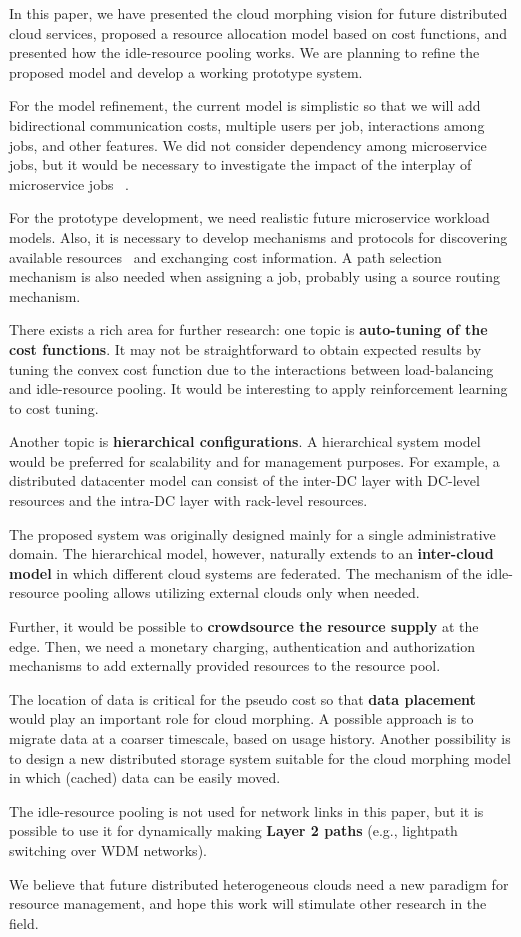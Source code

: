 
In this paper, we have presented the cloud morphing vision for
future distributed cloud services,
proposed a resource allocation model based on cost functions,
and presented how the idle-resource pooling works.
We are planning to refine the proposed model and develop a working
prototype system.

For the model refinement,
the current model is simplistic so that we will add bidirectional
communication costs,
multiple users per job, interactions among jobs, and other features.
We did not consider dependency among microservice jobs, but it would be
necessary to investigate the impact of the interplay of microservice
jobs ~\cite{Suresh-SOA-SOCC2017}.

For the prototype development,
we need realistic future microservice workload models.
Also, it is necessary to develop mechanisms and protocols for
discovering available resources~\cite{Albrecht2008} and exchanging
cost information.
A path selection mechanism is also needed when assigning a job,
probably using a source routing mechanism.

There exists a rich area for further research:
one topic is {\bf auto-tuning of the cost functions}.
It may not be straightforward to obtain expected results by tuning the
convex cost function due to the interactions between load-balancing
and idle-resource pooling.
It would be interesting to apply reinforcement learning to cost
tuning.

Another topic is {\bf hierarchical configurations}.
A hierarchical system model would be preferred for scalability
and for management purposes.
For example, a distributed datacenter model can consist of
the inter-DC layer with DC-level resources and the intra-DC layer
with rack-level resources.

The proposed system was originally designed mainly for a single
administrative domain.
The hierarchical model, however, naturally extends to
an {\bf inter-cloud model} in which different cloud systems are
federated.
The mechanism of the idle-resource pooling allows utilizing external
clouds only when needed.

Further, it would be possible to {\bf crowdsource the resource supply}
at the edge. 
Then, we need a monetary charging, authentication and authorization
mechanisms to add externally provided resources to the resource pool.

The location of data is critical for the pseudo cost so that
{\bf data placement} would play an important role for cloud morphing. 
A possible approach is to migrate data at a coarser timescale, based
on usage history.
Another possibility is to design a new distributed storage system
suitable for the cloud morphing model in which (cached) data can be
easily moved.

The idle-resource pooling is not used for network links in this paper, but
it is possible to use it for dynamically making {\bf Layer 2 paths}
(e.g., lightpath switching over WDM networks).

We believe that future distributed heterogeneous clouds need a new
paradigm for resource management, and hope this work will stimulate
other research in the field.
